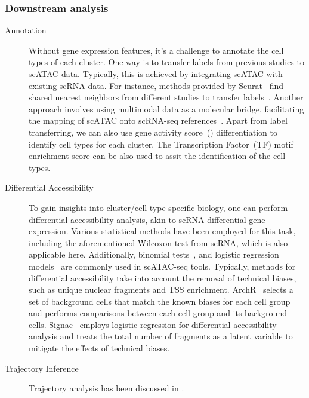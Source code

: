 \subsubsection{Downstream analysis}
\label{background:sec2:atac_downstream}
\begin{description}

	\item[Annotation]
	Without gene expression features, it's a challenge to annotate the cell types of each cluster. One way is to transfer labels from previous studies to scATAC data. Typically, this is achieved by integrating scATAC with existing scRNA data. For instance, methods provided by Seurat~\citep{stuart2019seurat3} find shared nearest neighbors from different studies to transfer labels~\citep{stuart2019seurat3}. Another approach involves using multimodal data as a molecular bridge, facilitating the mapping of scATAC onto scRNA-seq references~\citep{hao2023dictionary}. Apart from label transferring, we can also use gene activity score~() differentiation to identify cell types for each cluster. The Transcription Factor~(TF) motif enrichment score can be also used to assit the identification of the cell types.

	\item[Differential Accessibility]
	To gain insights into cluster/cell type-specific biology, one can perform differential accessibility analysis, akin to scRNA differential gene expression. Various statistical methods have been employed for this task, including the aforementioned Wilcoxon test from scRNA, which is also applicable here. Additionally, binomial tests~\citep{cusanovich2018single}, and logistic regression models~\citep{hao2021seurat4} are commonly used in scATAC-seq tools. Typically, methods for differential accessibility take into account the removal of technical biases, such as unique nuclear fragments and TSS enrichment. ArchR~\citep{Granja2021} selects a set of background cells that match the known biases for each cell group and performs comparisons between each cell group and its background cells. Signac~\citep{hao2021seurat4} employs logistic regression for differential accessibility analysis and treats the total number of fragments as a latent variable to mitigate the effects of technical biases.

	\item[Trajectory Inference]
	Trajectory analysis has been discussed in .



\end{description}
